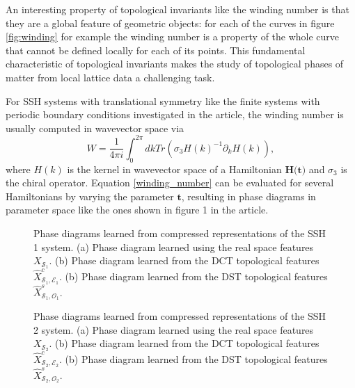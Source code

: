 \documentclass[10pt]{revtex4-1}
\newcommand\xSOne{$X_{\mathcal{S}_1}$}
\newcommand\xcSEOne{$\hat{X}^c_{\mathcal{S}_1,\mathcal{E}_1}$}
\newcommand\xsSOOne{$\hat{X}^s_{\mathcal{S}_1,\mathcal{O}_1}$}
\newcommand\xSTwo{$X_{\mathcal{S}_2}$}
\newcommand\xcSETwo{$\hat{X}^c_{\mathcal{S}_2,\mathcal{E}_2}$}
\newcommand\xsSOTwo{$\hat{X}^s_{\mathcal{S}_2,\mathcal{O}_2}$}
\newcommand\SSHOneCompressedRealSpacePhaseDiagram{./supp_ssh1_real_merge_imshow_winding_grids_second_sim.png}
\newcommand\SSHOneCompressedDCTPhaseDiagram{./supp_ssh1_dct_merge_imshow_winding_grids_second_sim.png}
\newcommand\SSHOneCompressedDSTPhaseDiagram{./supp_ssh1_dst_merge_imshow_winding_grids_second_sim.png}
\newcommand\SSHTwoCompressedRealSpacePhaseDiagram{./supp_ssh2_real_merge_imshow_winding_grids_sim.png}
\newcommand\SSHTwoCompressedDCTPhaseDiagram{./supp_ssh2_dct_merge_imshow_winding_grids_sim.png}
\newcommand\SSHTwoCompressedDSTPhaseDiagram{./supp_ssh2_dst_merge_imshow_winding_grids_sim.png}
\begin{document}
An interesting property of topological invariants like the winding number is that they are a global feature of geometric objects: for each of the curves in figure \ref{fig:winding} for example the winding number is a property of the whole curve that cannot be defined locally for each of its points. This fundamental characteristic of topological invariants makes the study of topological phases of matter from local lattice data a challenging task.   

For SSH systems with translational symmetry like the finite systems with periodic boundary conditions investigated in the article, the winding number is usually computed in wavevector space via
\begin{equation}\label{winding_number}
W=\frac{1}{4\pi i}\int_0^{2\pi} dk Tr( \sigma_3 H(k)^{-1} \partial_k H(k)),
\end{equation}
where $H(k)$ is the kernel in wavevector space of a Hamiltonian $\mathbf{H}$$($$\mathbf{t}$$)$ and $\sigma_3$ is the chiral operator. Equation \eqref{winding_number} can be evaluated for several Hamiltonians by varying the parameter $\mathbf{t}$, resulting in phase diagrams in parameter space like the ones shown in figure 1 in the article. %

\begin{figure}
\centering
{}
\caption{Phase diagrams learned from compressed representations of the SSH 1 system. (a) Phase diagram learned using the real space features \xSOne.  (b) Phase diagram learned from the DCT topological features \xcSEOne. (b) Phase diagram learned from the DST topological features \xsSOOne.}
\label{eng_feat_ssh1}
\end{figure}

\begin{figure}
\centering
{}
\caption{Phase diagrams learned from compressed representations of the SSH 2 system. (a) Phase diagram learned using the real space features \xSTwo.  (b) Phase diagram learned from the DCT topological features \xcSETwo. (b) Phase diagram learned from the DST topological features \xsSOTwo.}
\label{eng_feat_ssh2}
\end{figure}
\end{document}
